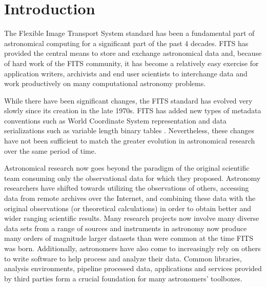 \documentclass[11pt,twoside]{article}
\begin{document}
\section{Introduction}

The Flexible Image Transport System standard
\citep[FITS;][]{1981A&AS...44..363W,2001A&A...376..359H,2010A&A...524A..42P}
has been a fundamental part of astronomical computing for a
significant part of the past 4 decades. FITS has provided the central
means to store and exchange astronomical data and, because of hard
work of the FITS community, it has become a relatively easy exercise
for application writers, archivists and end user scientists to
interchange data and work productively on many computational astronomy
problems. 



While there have been significant changes, the FITS standard has
evolved very slowly since its creation in the late 1970s. FITS has
added new types of metadata conventions such as World Coordinate
System
\citep[WCS;][]{2002A&A...395.1061G,2002A&A...395.1077C,2006A&A...446..747G}
representation and data serializations such as variable length binary
tables \citep{1995A&AS..113..159C}. Nevertheless, these changes have
not been sufficient to match the greater evolution in astronomical
research over the same period of time.

Astronomical research now goes beyond the paradigm of the original
scientific team consuming only the observational data for which they
proposed. Astronomy researchers have shifted towards utilizing the
observations of others, accessing data from remote archives over the
Internet, and combining these data with the original observations (or
theoretical calculations) in order to obtain better and wider ranging
scientific results. Many research projects now involve many diverse
data sets from a range of sources and instruments in astronomy now
produce many orders of magnitude larger datasets than were common at
the time FITS was born.  
Additionally, astronomers have also come to increasingly rely on 
others to write software to help process and analyze their data. Common 
libraries, analysis environments, pipeline processed data, applications 
and services provided by third parties form a crucial foundation for many
astronomers' toolboxes. 
\end{document}

